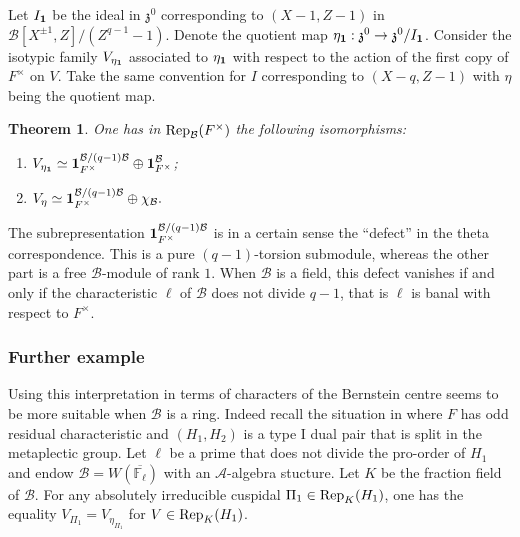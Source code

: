 \documentclass[11pt]{article}
\theoremstyle{plain}
\theoremstyle{definition}
\theoremstyle{plain}
\theoremstyle{definition}
\theoremstyle{plain}
\newtheorem{theorem}{Theorem}
\begin{document}
Let $I_{\textbf{\textup{1}}}$ be the ideal in $\mathfrak{z}^0$ corresponding to $(X-1,Z-1)$ in $\mathcal{B}[X^{\pm 1},Z]/(Z^{q-1}-1)$. Denote the quotient map $\eta_{\textbf{\textup{1}}} : \mathfrak{z}^0 \to \mathfrak{z}^0 / I_{\textbf{\textup{1}}}$. Consider the isotypic family $V_{\eta_{\textbf{\textup{1}}}}$ associated to $\eta_{\textbf{\textup{1}}}$ with respect to the action of the first copy of $F^\times$ on $V$. Take the same convention for $I$ corresponding to $(X-q,Z-1)$ with $\eta$ being the quotient map.

\begin{theorem} \label{isotypic_families_GL1_GL1_thm} One has in $\textup{Rep}_\mathcal{B}(F^\times)$ the following isomorphisms:

\begin{enumerate}[label=\textup{\alph*)}]
\item $V_{\eta_\textbf{\textup{1}}} \simeq \textbf{\textup{1}}_{F^\times}^{\mathcal{B}/(q-1)\mathcal{B}} \oplus \textbf{\textup{1}}_{F^\times}^\mathcal{B}$;
\item $V_\eta \simeq \textbf{\textup{1}}_{F^\times}^{\mathcal{B}/(q-1) \mathcal{B}} \oplus \chi_\mathcal{B}.$ \end{enumerate} \end{theorem}

The subrepresentation $\textbf{\textup{1}}_{F^\times}^{\mathcal{B}/(q-1) \mathcal{B}}$ is in a certain sense the ``defect'' in the theta correspondence. This is a pure $(q-1)$-torsion submodule, whereas the other part is a free $\mathcal{B}$-module of rank $1$. When $\mathcal{B}$ is a field, this defect vanishes if and only if the characteristic $\ell$ of $\mathcal{B}$ does not divide $q-1$, that is $\ell$ is banal with respect to $F^\times$.

\subsubsection*{Further example}

Using this interpretation in terms of %
characters of the Bernstein centre seems to be more suitable when $\mathcal{B}$ is a ring. Indeed recall the situation in \cite[Sec. 5.3]{trias_theta1} where $F$ has odd residual characteristic and $(H_1,H_2)$ is a type I dual pair that is split in the metaplectic group. Let $\ell$ be a prime that does not divide the pro-order of $H_1$ and endow $\mathcal{B}=W(\overline{\mathbb{F}_\ell})$ with an $\mathcal{A}$-algebra stucture. Let $K$ be the fraction field of $\mathcal{B}$. For any absolutely irreducible cuspidal $\Pi_1 \in \textup{Rep}_K(H_1)$, one has the equality $V_{\Pi_1} = V_{\eta_{\Pi_1}}$ for $V \in \textup{Rep}_K(H_1)$.
\end{document}

